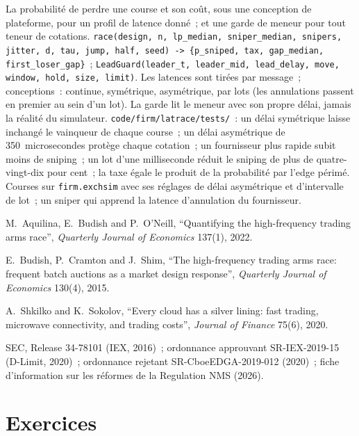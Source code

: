 \begin{build}
 La probabilité de perdre une course et son coût, sous une conception de plateforme, pour un profil de latence donné~; et une garde de meneur pour tout teneur de cotations.
\texttt{race(design, n, lp\_median, sniper\_median, snipers, jitter, d, tau, jump, half, seed) -> \{p\_sniped, tax, gap\_median, first\_loser\_gap\}}~; \texttt{LeadGuard(leader\_t, leader\_mid, lead\_delay, move, window, hold, size, limit)}.
 Les latences sont tirées par message~; conceptions~: continue, symétrique, asymétrique, par lots (les annulations passent en premier au sein d'un lot). La garde lit
le meneur avec son propre délai, jamais la réalité du simulateur.
 \texttt{code/firm/latrace/tests/}~: un délai symétrique laisse inchangé le vainqueur de chaque course~; un délai asymétrique de 350~microsecondes
protège chaque cotation~; un fournisseur plus rapide subit moins de sniping~; un lot d'une milliseconde réduit le sniping de plus de quatre-vingt-dix pour cent~; la taxe égale le
produit de la probabilité par l'edge périmé.
 Courses sur \texttt{firm.exchsim} avec ses réglages de délai asymétrique et d'intervalle de lot~; un sniper qui apprend la
latence d'annulation du fournisseur.
\end{build}

\begin{omsources}
\item M.~Aquilina, E.~Budish and P.~O'Neill, ``Quantifying the high-frequency trading arms race'', \emph{Quarterly Journal of Economics} 137(1), 2022.
\item E.~Budish, P.~Cramton and J.~Shim, ``The high-frequency trading arms race: frequent batch auctions as a market design response'',
\emph{Quarterly Journal of Economics} 130(4), 2015.
\item A.~Shkilko and K.~Sokolov, ``Every cloud has a silver lining: fast trading, microwave connectivity, and trading costs'', \emph{Journal of
Finance} 75(6), 2020.
\item SEC, Release 34-78101 (IEX, 2016)~; ordonnance approuvant SR-IEX-2019-15 (D-Limit, 2020)~; ordonnance rejetant SR-CboeEDGA-2019-012 (2020)~; fiche d'information sur les réformes de la Regulation
NMS (2026).
\end{omsources}

\section{Exercices}

